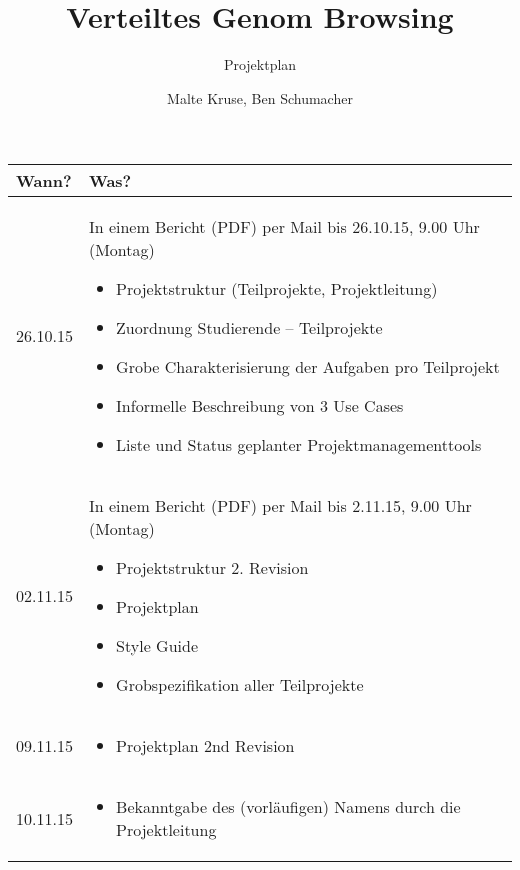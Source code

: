 \documentclass{scrartcl}
\title{Verteiltes Genom Browsing}
\subtitle{Projektplan}
\author{Malte Kruse, Ben Schumacher}
\begin{document}
\maketitle
\newpage
\begin{longtable}{| l | p{14cm} |}
\hline
\textbf{Wann?} & \textbf{Was?} \\
\hline
26.10.15 & In einem Bericht (PDF) per Mail bis 26.10.15, 9.00 Uhr (Montag)
\begin{itemize}
  \item Projektstruktur (Teilprojekte, Projektleitung)
  \item Zuordnung Studierende – Teilprojekte
  \item Grobe Charakterisierung der Aufgaben pro Teilprojekt
  \item Informelle Beschreibung von 3 Use Cases
  \item Liste und Status geplanter Projektmanagementtools 
\end{itemize}\\
 \hline
02.11.15 & In einem Bericht (PDF) per Mail bis 2.11.15, 9.00 Uhr (Montag)
\begin{itemize}
  \item Projektstruktur 2. Revision
  \item Projektplan
  \item Style Guide
  \item Grobspezifikation aller Teilprojekte
\end{itemize}\\
\hline
09.11.15 & \begin{itemize}
 \item Projektplan 2nd Revision
\end{itemize}\\
\hline
10.11.15 & \begin{itemize}
 \item Bekanntgabe des (vorläufigen) Namens durch die Projektleitung

\end{itemize}
\end{longtable}
\end{document}
